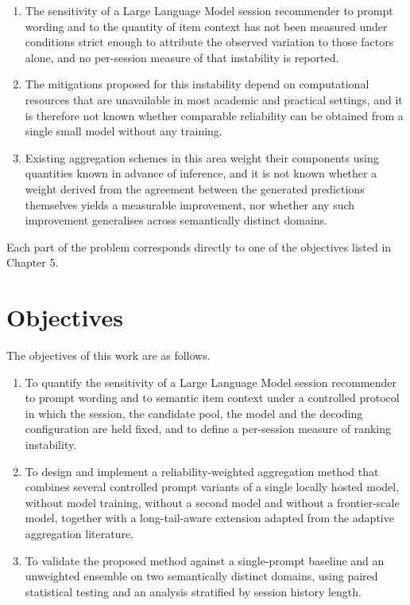 \documentclass[12pt,a4paper,oneside]{report}
\begin{document}
\begin{enumerate}[leftmargin=*]
\item The sensitivity of a Large Language Model session recommender to prompt
wording and to the quantity of item context has not been measured under
conditions strict enough to attribute the observed variation to those factors
alone, and no per-session measure of that instability is reported.

\item The mitigations proposed for this instability depend on computational
resources that are unavailable in most academic and practical settings, and it
is therefore not known whether comparable reliability can be obtained from a
single small model without any training.

\item Existing aggregation schemes in this area weight their components using
quantities known in advance of inference, and it is not known whether a weight
derived from the agreement between the generated predictions themselves yields a
measurable improvement, nor whether any such improvement generalises across
semantically distinct domains.
\end{enumerate}

Each part of the problem corresponds directly to one of the objectives listed in
Chapter 5.

\chapter{Objectives}

The objectives of this work are as follows.

\begin{enumerate}[leftmargin=*]
\item To quantify the sensitivity of a Large Language Model session recommender
to prompt wording and to semantic item context under a controlled protocol in
which the session, the candidate pool, the model and the decoding configuration
are held fixed, and to define a per-session measure of ranking instability.

\item To design and implement a reliability-weighted aggregation method that
combines several controlled prompt variants of a single locally hosted model,
without model training, without a second model and without a frontier-scale
model, together with a long-tail-aware extension adapted from the adaptive
aggregation literature.

\item To validate the proposed method against a single-prompt baseline and an
unweighted ensemble on two semantically distinct domains, using paired
statistical testing and an analysis stratified by session history length.
\end{enumerate}
\end{document}
